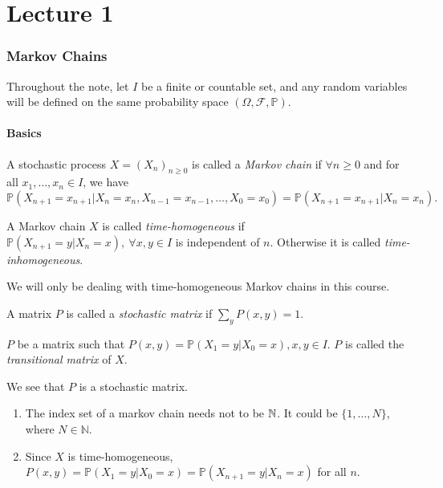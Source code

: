 \documentclass[a4paper]{article}
\begin{document}
\maketitle
\tableofcontents
\newpage
\part*{Lecture 1}
\section{Markov Chains}
Throughout the note, let $ I $ be a finite or countable set, and any random variables will be defined on the same probability space $ (\Omega, \mathcal{F}, \mathbb{P}) $.
\subsection{Basics}
\begin{definition}
    A stochastic process $ X=(X_n)_{n\ge 0} $ is called a \textit{Markov chain} if $ \forall n\ge 0 $ and for all $ x_1,\dots,x_n\in I $, we have 
    \[
        \mathbb{P}(X_{n+1}=x_{n+1}|X_n=x_n, X_{n-1}=x_{n-1}, \dots, X_0=x_0) = \mathbb{P}(X_{n+1}=x_{n+1}|X_n=x_n).
    \]
\end{definition}
\begin{definition}
    A Markov chain $X$ is called \textit{time-homogeneous} if $ \mathbb{P}(X_{n+1}=y|X_n=x),\ \forall x,y\in I $ is independent of $n$. Otherwise it is called \textit{time-inhomogeneous}.
\end{definition}
We will only be dealing with time-homogeneous Markov chains in this course.
\begin{definition}
    A matrix $P$ is called a \textit{stochastic matrix} if $ \sum_{y}P(x,y)=1 $.
\end{definition}

\begin{definition}
    $P$ be a matrix such that $ P(x,y) = \mathbb{P}(X_1=y|X_0=x), x,y\in I $. $P$ is called the \textit{transitional matrix} of $X$.
\end{definition}

We see that $P$ is a stochastic matrix.

\begin{remark}
    \begin{enumerate}
        \item The index set of a markov chain needs not to be ${\mathbb{N}}$. It could be $ \{1,\dots,N\} $, where $ N\in \mathbb{N} $.
        \item Since $X$ is time-homogeneous, $ P(x,y)=\mathbb{P}(X_1=y|X_0=x)=\mathbb{P}(X_{n+1}=y|X_n=x) $ for all $n$.
    \end{enumerate}
\end{remark}
\end{document}
